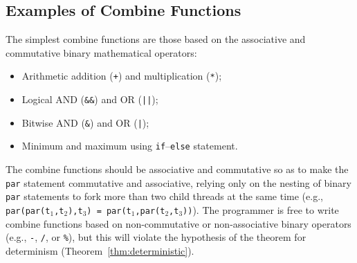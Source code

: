 \subsection{Examples of Combine Functions}
\label{sec:forec_combine:functions}
The simplest combine functions are those based on the 
associative and commutative binary mathematical operators: 
\begin{itemize}
	\item Arithmetic addition (\texttt{+}) and multiplication (\texttt{*});
	\item Logical AND (\texttt{\&\&}) and OR (\texttt{||});
	\item Bitwise AND (\texttt{\&}) and OR (\texttt{|});
	\item Minimum and maximum using \texttt{if}--\texttt{else} statement.
\end{itemize}
The combine functions should be associative and commutative so 
as to make the \texttt{par} statement commutative and associative,
relying only on the nesting of binary \texttt{par} statements
to fork more than two child threads at the same time
(e.g., \texttt{par(par(t$_1$,t$_2$),t$_3$) = par(t$_1$,par(t$_2$,t$_3$))}). 
The programmer is free to write combine functions
based on non-commutative or non-associative binary operators
(e.g., \texttt{-}, \texttt{/}, or \texttt{\%}),
but this will violate the hypothesis of the theorem for determinism 
(Theorem~\ref{thm:deterministic}).

